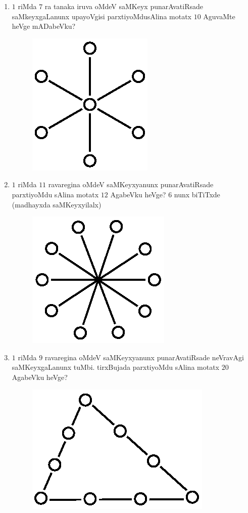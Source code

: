\begin{enumerate}
\item $1$ riMda $7$ ra tanaka iruva oMdeV saMKeyx punarAvatiRsade saMkeyxgaLanunx upayoVgisi parxtiyoMdusAlina motatx $10$ AguvaMte heVge mADabeVku?
\begin{figure}[H]
\centering
\includegraphics{src/figures/exr19.eps}
\end{figure}

\item $1$ riMda $11$ ravaregina oMdeV saMKeyxyanunx punarAvatiRsade parxtiyoMdu sAlina motatx $12$ AgabeVku heVge? $6$ nunx biTiTxde (madhayxda saMKeyxyilalx)
\begin{figure}[H]
\centering
\includegraphics{src/figures/exr20.eps}
\end{figure}

\item $1$ riMda $9$ ravaregina oMdeV saMKeyxyanunx punarAvatiRsade neVravAgi saMKeyxgaLanunx tuMbi. tirxBujada parxtiyoMdu sAlina motatx $20$ AgabeVku heVge?
\begin{figure}[H]
\centering
\includegraphics{src/figures/exr21.eps}
\end{figure}




\end{enumerate}
